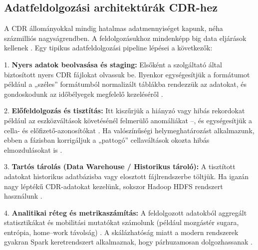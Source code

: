 \subsection{Adatfeldolgozási architektúrák CDR-hez}
  
A CDR állományokkal mindig hatalmas adatmennyiséget kapunk, néha százmilliós nagyságrendben. A feldolgozásukhoz mindenképp big data eljárások kellenek \cite{pinter2022awakening, zhang2019connected}. Egy tipikus adatfeldolgozási pipeline lépései a következők:

1. \textbf{Nyers adatok beolvasása és staging:} Elsőként a szolgáltató által biztosított nyers CDR fájlokat olvassuk be. Ilyenkor egységesítjük a formátumot például a „széles” formátumból normalizált táblákba rendezzük az adatokat, és gondoskodunk az időbélyegek megfelelő kezeléséről \cite{pinter2022awakening}.

2. \textbf{Előfeldolgozás és tisztítás:} Itt kiszűrjük a hiányzó vagy hibás rekordokat például az eszközváltások követésénél felmerülő anomáliákat –, és egységesítjük a cella- és előfizető-azonosítókat \cite{pinter2020artificial, pinter2022awakening}. Ha valószínűségi helymeghatározást alkalmazunk, ebben a fázisban korrigáljuk a „pattogó” cellaváltások okozta hibás elmozdulásokat is \cite{traag2011social}.

3. \textbf{Tartós tárolás (Data Warehouse / Historikus tároló):} A tisztított adatokat historikus adatbázisba vagy elosztott fájlrendszerbe töltjük. Ha igazán nagy léptékű CDR-adatokat kezelünk, sokszor Hadoop HDFS rendszert használunk \cite{zhang2019connected}.

4. \textbf{Analitikai réteg és metrikaszámítás:} A feldolgozott adatokból aggregált statisztikákat és mobilitási mutatókat számolunk (például mozgástér sugara, entrópia, home–work távolság) \cite{pinter2020artificial, pinter2021evaluating}. A skálázhatóság miatt a modern rendszerek gyakran Spark keretrendszert alkalmaznak, hogy párhuzamosan dolgozhassanak \cite{zhang2019connected}.

